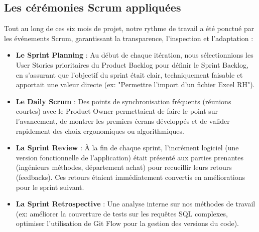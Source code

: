 \subsection{Les cérémonies Scrum appliquées}
Tout au long de ces six mois de projet, notre rythme de travail a été ponctué par les événements Scrum, garantissant la transparence, l'inspection et l'adaptation :
\begin{itemize}
    \item \textbf{Le Sprint Planning} : Au début de chaque itération, nous sélectionnions les User Stories prioritaires du Product Backlog pour définir le Sprint Backlog, en s'assurant que l'objectif du sprint était clair, techniquement faisable et apportait une valeur directe (ex: "Permettre l'import d'un fichier Excel RH").
    \item \textbf{Le Daily Scrum} : Des points de synchronisation fréquents (réunions courtes) avec le Product Owner permettaient de faire le point sur l'avancement, de montrer les premiers écrans développés et de valider rapidement des choix ergonomiques ou algorithmiques.
    \item \textbf{La Sprint Review} : À la fin de chaque sprint, l'incrément logiciel (une version fonctionnelle de l'application) était présenté aux parties prenantes (ingénieurs méthodes, département achat) pour recueillir leurs retours (feedbacks). Ces retours étaient immédiatement convertis en améliorations pour le sprint suivant.
    \item \textbf{La Sprint Retrospective} : Une analyse interne sur nos méthodes de travail (ex: améliorer la couverture de tests sur les requêtes SQL complexes, optimiser l'utilisation de Git Flow pour la gestion des versions du code).
\end{itemize}

